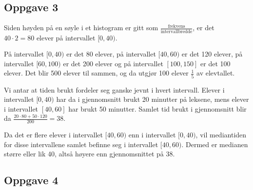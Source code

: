 \newpage
\subsection*{Oppgave 3}
Siden høyden på en søyle i et histogram er gitt som $\frac{\text{frekvens}}{\text{intervallbredde}}$, er det\\ $40\cdot 2=80$ elever på intervallet $[0, 40)$. \os

På intervallet $[0, 40)$ er det 80 elever, på intervallet $[40, 60)$ er det 120 elever, på intervallet $[60, 100)$ er det 200 elever og på intervallet $[100, 150]$ er det 100 elever. Det blir 500 elever til sammen, og da utgjør 100 elever $\frac{1}{5}$ av elevtallet. \os

Vi antar at tiden brukt fordeler seg ganske jevnt i hvert intervall. Elever i intervallet $[0, 40)$ har da i gjennomsnitt brukt 20 minutter på leksene, mens elever i intervallet $[40, 60]$ har brukt 50 minutter. Samlet tid brukt i gjennomsnitt blir da $\frac{20\cdot 80+50\cdot120}{200}=38$.\os

Da det er flere elever i intervallet $[40, 60)$ enn i intervallet $[0, 40)$, vil mediantiden for disse intervallene samlet befinne seg i intervallet $[40, 60)$. Dermed er medianen større eller lik 40, altså høyere enn gjennomsnittet på 38.

\subsection*{Oppgave 4}

